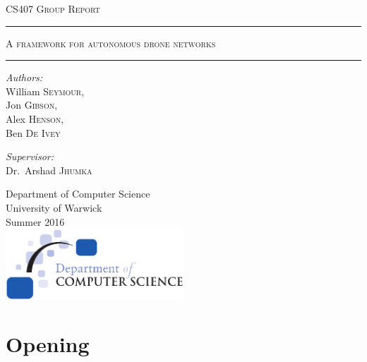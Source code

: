 \documentclass[12pt,a4paper,twoside]{report}
\begin{document}
\begin{titlepage}
\begin{center}

\textsc{\LARGE CS407 Group Report}\\[1.5cm]
\vspace{1.5cm}

\hrule
\vspace{0.2cm}
\textsc{\LARGE A framework for autonomous drone networks}\\
\vspace{0.2cm}
\hrule

\vspace{1.5cm}
\noindent
\begin{minipage}{0.4\textwidth}
	\begin{flushleft} \large
		\emph{Authors:}\\
		William \textsc{Seymour}, \\ Jon \textsc{Gibson}, \\ Alex \textsc{Henson}, \\ Ben \textsc{De Ivey}
	\end{flushleft}
\end{minipage}%
\begin{minipage}{0.4\textwidth}
	\begin{flushright} \large
		\emph{Supervisor:} \\
		Dr.~Arshad \textsc{Jhumka}
	\end{flushright}
\end{minipage}

\vfill
\large Department of Computer Science\\
\large University of Warwick\\
\large Summer 2016\\
\vfill
\includegraphics[width=0.50\textwidth]{img/dcslogo.png}~\\[1cm]
\end{center}
\end{titlepage}

\tableofcontents
\listoffigures
\listoftables

\abstract{\lipsum[1]}

\chapter{Opening}
\end{document}
